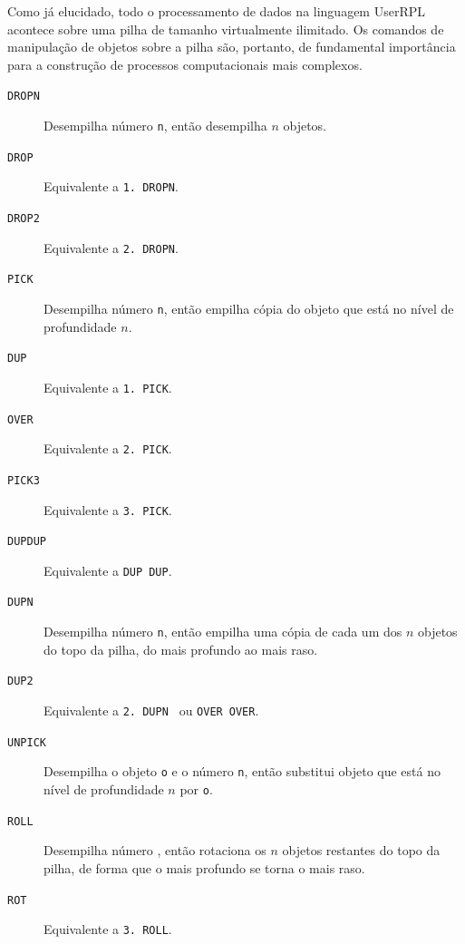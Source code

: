 \documentclass[12pt,a4paper]{report}
\newcommand{\kwd}[1]{\texttt{\textcolor{keyword}{#1}}}
\newcommand{\DUP}{\kwd{DUP}}   %
\newcommand{\DROP}{\kwd{DROP}}   %
\newcommand{\OVER}{\kwd{OVER}}   %
\newcommand{\ROT}{\kwd{ROT}}   %
\newcommand{\ROLL}{\kwd{ROLL}}   %
\newcommand{\PICK}{\kwd{PICK}}   %
\newcommand{\DUPN}{\kwd{DUPN}}   %
\newcommand{\UNPICK}{\kwd{UNPICK}}   %
\newcommand{\DUPDUP}{\kwd{DUPDUP}}   %
\newcommand{\DROPN}{\kwd{DROPN}}   %
\newcommand{\DROPTWO}{\kwd{DROP2}}   %
\newcommand{\PICKTHREE}{\kwd{PICK3}}   %
\newcommand{\DUPTWO}{\kwd{DUP2}}   %
\numberwithin{theorem}{chapter}
\begin{document}
Como já elucidado, todo o processamento de dados na linguagem UserRPL
acontece sobre uma pilha de tamanho virtualmente ilimitado.  Os
comandos de manipulação de objetos sobre a pilha são, portanto, de
fundamental importância para a construção de processos computacionais
mais complexos.

\begin{description}
  \item[\DROPN]\label{DROPN} Desempilha número \texttt{n}, então
    desempilha \(n\) objetos.

  \item[\DROP]\label{DROP} Equivalente a \texttt{1. \DROPN}.

  \item[\DROPTWO]\label{DROPTWO} Equivalente a \texttt{2. \DROPN}.

  \item[\PICK]\label{PICK} Desempilha número \texttt{n}, então empilha
    cópia do objeto que está no nível de profundidade \(n\).

  \item[\DUP]\label{DUP} Equivalente a \texttt{1. \PICK}.

  \item[\OVER]\label{OVER} Equivalente a \texttt{2. \PICK}.

  \item[\PICKTHREE]\label{PICKTHREE} Equivalente a \texttt{3. \PICK}.

  \item[\DUPDUP]\label{DUPDUP} Equivalente a \DUP\ \DUP.

  \item[\DUPN]\label{DUPN} Desempilha número \texttt{n}, então empilha
    uma cópia de cada um dos \(n\) objetos do topo da pilha, do mais
    profundo ao mais raso.

  \item[\DUPTWO]\label{DUPTWO} Equivalente a \texttt{2. \DUPN\ } ou
    \OVER\ \OVER.

  \item[\UNPICK]\label{UNPICK} Desempilha o objeto \texttt{o} e o
    número \texttt{n}, então substitui objeto que está no nível de
    profundidade \(n\) por \texttt{o}.

  \item[\ROLL]\label{ROLL} Desempilha número , então
    rotaciona os \(n\) objetos restantes do topo da pilha, de forma
    que o mais profundo se torna o mais raso.

  \item[\ROT]\label{ROT} Equivalente a \texttt{3. \ROLL}.


\end{description}
\end{document}
